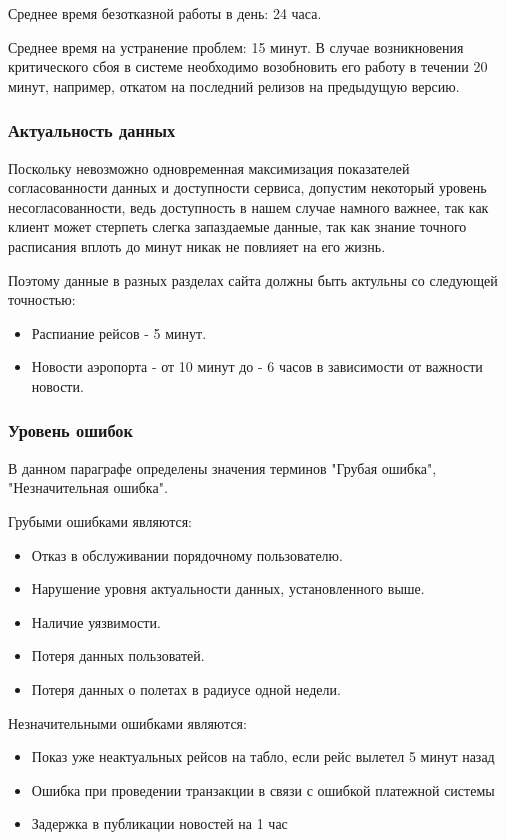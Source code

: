 Среднее время безотказной работы в день: 24 часа.

Среднее время на устранение проблем: 15 минут.
В случае возникновения критического сбоя в системе
необходимо возобновить его работу в течении 20 минут,
например, откатом на последний релизов на
предыдущую версию.

\subsubsection{Актуальность данных}

Поскольку невозможно одновременная максимизация
показателей согласованности данных и доступности
сервиса, допустим некоторый уровень несогласованности,
ведь доступность в нашем случае намного важнее,
так как клиент может стерпеть слегка запаздаемые
данные, так как знание точного расписания вплоть до
минут никак не повлияет на его жизнь.

Поэтому данные в разных разделах сайта должны
быть актульны со следующей точностью:
\begin{itemize}
      \item Распиание рейсов - 5 минут.
      \item Новости аэропорта - от 10 минут
            до - 6 часов в зависимости от
            важности новости.
\end{itemize}

\subsubsection{Уровень ошибок}

В данном параграфе определены значения терминов
"Грубая ошибка", "Незначительная ошибка".

Грубыми ошибками являются:
\begin{itemize}
      \item Отказ в обслуживании
            порядочному пользователю.
      \item Нарушение уровня актуальности данных,
            установленного выше.
      \item Наличие уязвимости.
      \item Потеря данных пользоватей.
      \item Потеря данных о полетах
            в радиусе одной недели.
\end{itemize}

Незначительными ошибками являются:
\begin{itemize}
      \item Показ уже неактуальных рейсов на табло,
            если рейс вылетел 5 минут назад
      \item Ошибка при проведении транзакции в связи
            с ошибкой платежной системы
      \item Задержка в публикации новостей на 1 час
\end{itemize}
